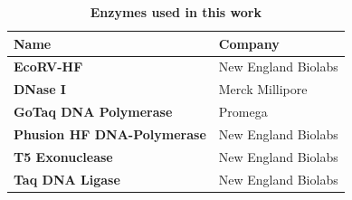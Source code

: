 \begin{table}[H]
        \caption{\textbf{Enzymes used in this work}}
        \label{tab:enzyme_list}
        \begin{tabular}{|Y{7.3cm}|Y{7.3cm}|}
            \hline
                \textbf{Name} &  \textbf{Company}  \\ 
            \hline
                \textbf{EcoRV-HF} & New England Biolabs\\
                \textbf{DNase I} & Merck Millipore\\
                \textbf{GoTaq DNA Polymerase} & Promega\\
                \textbf{Phusion HF DNA-Polymerase} & New England Biolabs\\
                \textbf{T5 Exonuclease} & New England Biolabs\\
                \textbf{Taq DNA Ligase} & New England Biolabs\\
            \hline
        \end{tabular}   
\end{table}
